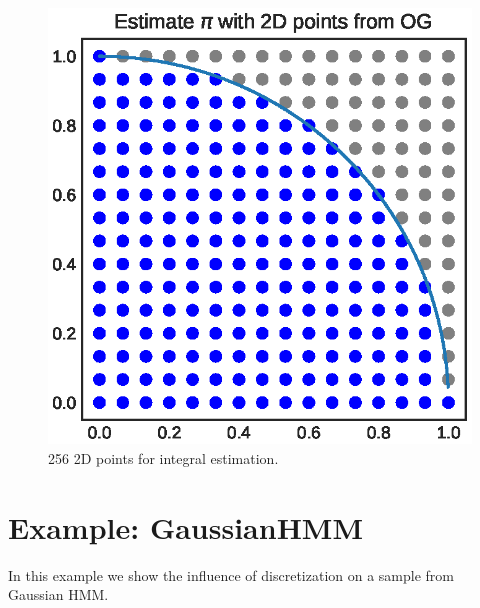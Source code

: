 \documentclass[shortabstract]{iithesis}
\begin{document}
\begin{figure}[!ht]
    \includegraphics[scale=.6]{OG_2D_circle.eps}
    \caption{256 2D points for integral estimation.}
    \label{fig:toy-points2}
\end{figure}

\newpage



\section{Example: GaussianHMM}

In this example we show the influence of discretization  on a sample from Gaussian HMM.
\end{document}
